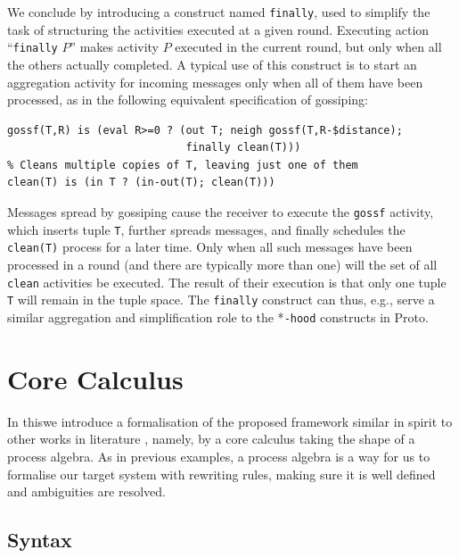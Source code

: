 \documentclass[12pt,a4paper,twoside,openright]{book}
\begin{document}
We conclude by introducing a construct named \texttt{finally}, used to simplify the task of structuring the activities executed at a given round.
%
Executing action ``\texttt{finally} $P$'' makes activity $P$ executed in the current round, but only when all the others actually completed.
%
A typical use of this construct is to start an aggregation activity for incoming messages only when all of them have been processed, as in the following equivalent specification of gossiping:
{
\begin{verbatim}
gossf(T,R) is (eval R>=0 ? (out T; neigh gossf(T,R-$distance); 
                            finally clean(T)))
% Cleans multiple copies of T, leaving just one of them
clean(T) is (in T ? (in-out(T); clean(T)))
\end{verbatim}
}

\noindent Messages spread by gossiping cause the receiver to execute the \texttt{gossf} activity, which inserts tuple \texttt{T}, further spreads messages, and finally schedules the \texttt{clean(T)} process for a later time.
%
Only when all such messages have been processed in a round (and there are typically more than one) will the set of all \texttt{clean} activities be executed.
%
The result of their execution is that only one tuple \texttt{T} will remain in the tuple space.  The \texttt{finally} construct can thus, e.g., serve a similar aggregation and simplification role to the *\texttt{-hood} constructs in Proto.

\section{Core Calculus}

In this\levelText{}we introduce a formalisation of the proposed framework similar in spirit to other works in literature \cite{zavattaro,klaim,biochemicalTupleSpaces}, namely, by a core calculus taking the shape of a process algebra.
%
As in previous examples, a process algebra is a way for us to formalise our target system with rewriting rules, making sure it is well defined and ambiguities are resolved.

\subsection{Syntax}
\end{document}
